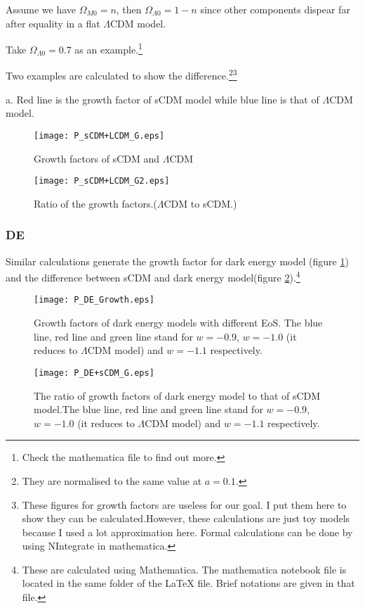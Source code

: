 Assume we have $\Omega_{M0}=n$, then $\Omega_{\Lambda 0}=1-n$ since other components dispear far after equality in a flat $\Lambda$CDM model.

Take $\Omega_{\Lambda 0}=0.7$ as an example.{\footnote{
Check the mathematica file to find out more.
}}



Two examples are calculated to show the difference.{\footnote{
They are normalised to the same value at $a=0.1$.
}}{\footnote{{\color{blue}These figures for growth factors are useless for our goal. I put them here to show they can be calculated.}{\color{red}However, these calculations are just toy models because I used a lot approximation here. Formal calculations can be done by using NIntegrate in mathematica.}}}

a. Red line is the growth factor of sCDM model while blue line is that of $\Lambda$CDM model.


\begin{figure}[h]

\centering
\texttt{[image: P\_sCDM+LCDM\_G.eps]}
\caption{Growth factors of sCDM and $\Lambda$CDM}
\end{figure}

\begin{figure}
\centering
\texttt{[image: P\_sCDM+LCDM\_G2.eps]}
\caption{Ratio of the growth factors.($\Lambda$CDM to sCDM.)}
\end{figure}




\subsubsection{DE}

Similar calculations generate the growth factor for dark energy model (figure \ref{DE_G}) and the difference between sCDM and dark energy model(figure \ref{DE+sCDM_G}).{\footnote{{\color{red}
These are calculated using Mathematica. The mathematica notebook file is located in the same folder of the {\LaTeX} file. Brief notations are given in that file.
}}}

\begin{figure}[h]
\centering
\texttt{[image: P\_DE\_Growth.eps]}
\caption{Growth factors of dark energy models with different EoS. The blue line,  red line and green line stand for $w=-0.9$, $w=-1.0$ (it reduces to $\Lambda$CDM model) and $w=-1.1$ respectively.} \label{DE_G}
\end{figure}

\begin{figure}[h]
\centering
\texttt{[image: P\_DE+sCDM\_G.eps]}
\caption{The ratio of growth factors of dark energy model to that of sCDM model.The blue line,  red line and green line stand for $w=-0.9$, $w=-1.0$ (it reduces to $\Lambda$CDM model) and $w=-1.1$ respectively. }\label{DE+sCDM_G}
\end{figure}



